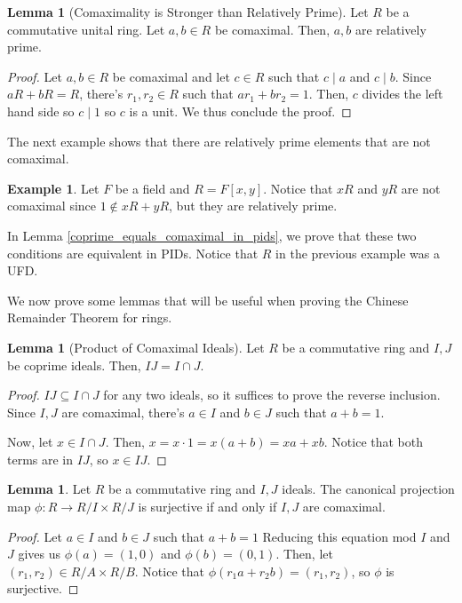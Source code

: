 \documentclass{article}
\theoremstyle{definition}
\newtheorem{lemma}[theorem]{Lemma}
\newtheorem{example}[theorem]{Example}
\begin{document}
\begin{lemma}[Comaximality is Stronger than Relatively Prime]
    Let $R$ be a commutative unital ring. Let $a,b \in R$ be comaximal. Then, $a,b$ are relatively prime.
\end{lemma}
\begin{proof}
    Let $a,b \in R$ be comaximal and let $c \in R$ such that $c \mid a$ and $c \mid b$. Since $aR + bR = R$, there's $r_{1},r_{2} \in R$ such that
    $a r_{1} + b r_{2} = 1$. Then, $c$ divides the left hand side so $c \mid 1$ so $c$ is a unit. We thus conclude the proof.
\end{proof}


The next example shows that there are relatively prime elements that are not comaximal.

\begin{example}
    Let $F$ be a field and $R = F[x,y]$. Notice that $xR$ and $yR$ are not comaximal since $1 \notin xR + yR$, but they are relatively prime.
\end{example}

In Lemma \ref{coprime_equals_comaximal_in_pids}, we prove that these two conditions are equivalent in PIDs. 
Notice that $R$ in the previous example was a UFD.

We now prove some lemmas that will be useful when proving the Chinese Remainder Theorem for rings.

\begin{lemma}[Product of Comaximal Ideals]\label{product_of_coprime_ideals_is_the_intersection}
    Let $R$ be a commutative ring and $I,J$ be coprime ideals.
    Then, $IJ = I \cap J$.
\end{lemma}
\begin{proof}
    $IJ \subseteq I \cap J$ for any two ideals, so it suffices to prove the reverse inclusion.
    Since $I,J$ are comaximal, there's $a \in I$ and $b \in J$ such that $a + b = 1$.
    
    Now, let $x \in I \cap J$. Then, $x = x \cdot 1 = x(a + b) = xa + xb$.
    Notice that both terms are in $IJ$, so $x \in IJ$.
\end{proof}

\begin{lemma}\label{comaximality_gives_surjective_projection}
    Let $R$ be a commutative ring and $I,J$ ideals. 
    The canonical projection map $\phi: R \xrightarrow{} R/I \times R/J$ is surjective 
    if and only if $I,J$ are comaximal.
\end{lemma}
\begin{proof}
    Let $a \in I$ and $b \in J$ such that $a + b = 1$
    Reducing this equation mod $I$ and $J$ gives us $\phi(a) = (1,0)$ and 
    $\phi(b) = (0,1)$. Then, let $(r_{1},r_{2}) \in R/A \times R/B$.
    Notice that $\phi(r_{1}a + r_{2}b) = (r_{1},r_{2})$, so $\phi$ is surjective.
\end{proof}
\end{document}

